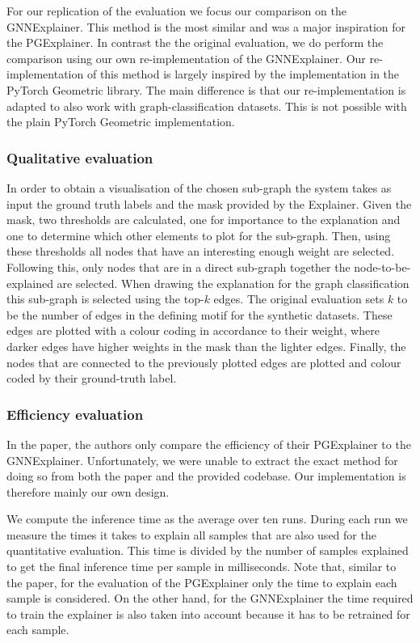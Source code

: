 For our replication of the evaluation we focus our comparison on the GNNExplainer. This method is the most similar and was a major inspiration for the PGExplainer. In contrast the the original evaluation, we do perform the comparison using our own re-implementation of the GNNExplainer. Our re-implementation of this method is largely inspired by the implementation in the PyTorch Geometric library. The main difference is that our re-implementation is adapted to also work with graph-classification datasets. This is not possible with the plain PyTorch Geometric implementation. 

\subsubsection{Qualitative evaluation}
In order to obtain a visualisation of the chosen sub-graph the system takes as input the ground truth labels and the mask provided by the Explainer. Given the mask, two thresholds are calculated, one for importance to the explanation and one to determine which other elements to plot for the sub-graph. Then, using these thresholds all nodes that have an interesting enough weight are selected. Following this, only nodes that are in a direct sub-graph together the node-to-be-explained are selected. When drawing the explanation for the graph classification this sub-graph is selected using the top-$k$ edges. The original evaluation sets $k$ to be the number of edges in the defining motif for the synthetic datasets. These edges are plotted with a colour coding in accordance to their weight, where darker edges have higher weights in the mask than the lighter edges. Finally, the nodes that are connected to the previously plotted edges are plotted and colour coded by their ground-truth label.

\subsubsection{Efficiency evaluation}
In the paper, the authors only compare the efficiency of their PGExplainer to the GNNExplainer. Unfortunately, we were unable to extract the exact method for doing so from both the paper and the provided codebase. Our implementation is therefore mainly our own design.

We compute the inference time as the average over ten runs. During each run we measure the times it takes to explain all samples that are also used for the quantitative evaluation. This time is divided by the number of samples explained to get the final inference time per sample in milliseconds. Note that, similar to the paper, for the evaluation of the PGExplainer only the time to explain each sample is considered. On the other hand, for the GNNExplainer the time required to train the explainer is also taken into account because it has to be retrained for each sample. 

